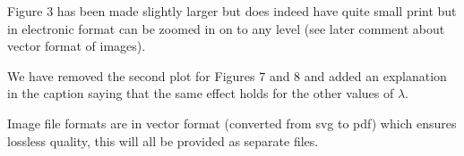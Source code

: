 \documentclass{article}
\begin{document}
Figure 3 has been made slightly larger but does indeed have quite small print
but in electronic format can be zoomed in on to any level (see later comment
about vector format of images).

We have removed the second plot for Figures 7 and 8 and added an explanation in the caption saying that the same effect holds for the other values of \(\lambda\).

Image file formats are in vector format (converted from svg to pdf) which
ensures lossless quality, this will all be provided as separate files.
\end{document}
